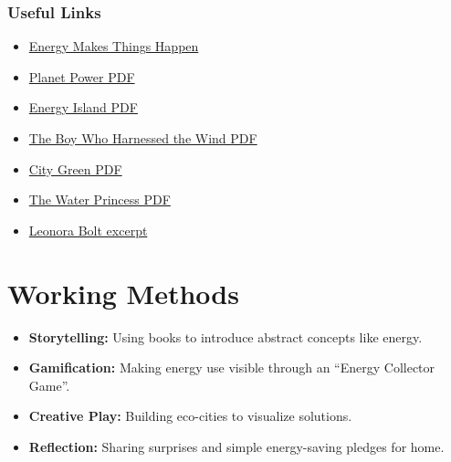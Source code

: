 \documentclass[11pt, a4paper]{article}
\begin{document}
\subsubsection*{Useful Links}
\begin{itemize}
    \item \href{https://www.solutioninn.com/textbooks/energy-makes-things-happen-1st-edition-978-0064452137-912747}{Energy Makes Things Happen}
    \item \href{https://www.suntrapcentre.co.uk/sites/default/files/2022-02/planet%20power.pdf}{Planet Power PDF}
    \item \href{https://cdn.bookey.app/files/pdf/book/en/energy-island.pdf}{Energy Island PDF}
    \item \href{https://theboywhoharnessedthewind.wordpress.com/wp-content/uploads/2015/07/kamkwamba-william-the-boy-who-harnessed-the-wind.pdf}{The Boy Who Harnessed the Wind PDF}
    \item \href{https://valuesweliveby.wordpress.com/wp-content/uploads/2019/01/city-green-dyanne-disalvo-ryan.-pdf.pdf}{City Green PDF}
    \item \href{https://cdn.bookey.app/files/pdf/book/en/the-water-princess.pdf}{The Water Princess PDF}
    \item \href{https://www.jellybooks.com/cloud_reader/excerpts/leonora-bolt-secret-inventor_9780241436776-ex/QWKyQ}{Leonora Bolt excerpt}
\end{itemize}

\section{Working Methods}
\begin{itemize}
    \item \textbf{Storytelling:} Using books to introduce abstract concepts like energy.
    \item \textbf{Gamification:} Making energy use visible through an ``Energy Collector Game''.
    \item \textbf{Creative Play:} Building eco-cities to visualize solutions.
    \item \textbf{Reflection:} Sharing surprises and simple energy-saving pledges for home.
\end{itemize}
\end{document}

